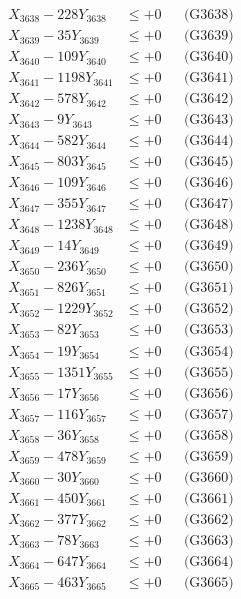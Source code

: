 \documentclass[a4paper,10pt]{article}
\begin{document}
{\begin{align}
X_{3638} - 228Y_{3638} &\leq +0 && \text{(G3638)} \\
X_{3639} - 35Y_{3639} &\leq +0 && \text{(G3639)} \\
X_{3640} - 109Y_{3640} &\leq +0 && \text{(G3640)} \\
\allowbreak
X_{3641} - 1198Y_{3641} &\leq +0 && \text{(G3641)} \\
X_{3642} - 578Y_{3642} &\leq +0 && \text{(G3642)} \\
X_{3643} - 9Y_{3643} &\leq +0 && \text{(G3643)} \\
X_{3644} - 582Y_{3644} &\leq +0 && \text{(G3644)} \\
X_{3645} - 803Y_{3645} &\leq +0 && \text{(G3645)} \\
X_{3646} - 109Y_{3646} &\leq +0 && \text{(G3646)} \\
X_{3647} - 355Y_{3647} &\leq +0 && \text{(G3647)} \\
X_{3648} - 1238Y_{3648} &\leq +0 && \text{(G3648)} \\
X_{3649} - 14Y_{3649} &\leq +0 && \text{(G3649)} \\
X_{3650} - 236Y_{3650} &\leq +0 && \text{(G3650)} \\
\allowbreak
X_{3651} - 826Y_{3651} &\leq +0 && \text{(G3651)} \\
X_{3652} - 1229Y_{3652} &\leq +0 && \text{(G3652)} \\
X_{3653} - 82Y_{3653} &\leq +0 && \text{(G3653)} \\
X_{3654} - 19Y_{3654} &\leq +0 && \text{(G3654)} \\
X_{3655} - 1351Y_{3655} &\leq +0 && \text{(G3655)} \\
X_{3656} - 17Y_{3656} &\leq +0 && \text{(G3656)} \\
X_{3657} - 116Y_{3657} &\leq +0 && \text{(G3657)} \\
X_{3658} - 36Y_{3658} &\leq +0 && \text{(G3658)} \\
X_{3659} - 478Y_{3659} &\leq +0 && \text{(G3659)} \\
X_{3660} - 30Y_{3660} &\leq +0 && \text{(G3660)} \\
\allowbreak
X_{3661} - 450Y_{3661} &\leq +0 && \text{(G3661)} \\
X_{3662} - 377Y_{3662} &\leq +0 && \text{(G3662)} \\
X_{3663} - 78Y_{3663} &\leq +0 && \text{(G3663)} \\
X_{3664} - 647Y_{3664} &\leq +0 && \text{(G3664)} \\
X_{3665} - 463Y_{3665} &\leq +0 && \text{(G3665)} \\

\end{align}}
\end{document}
